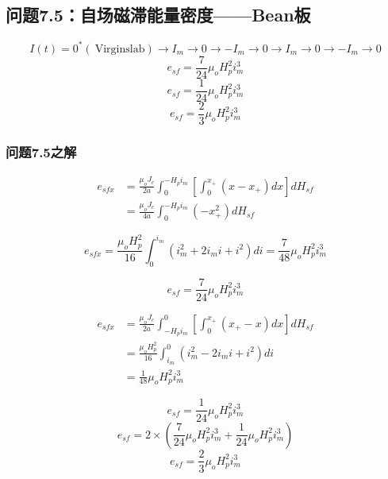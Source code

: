 \subsection{问题7.5：自场磁滞能量密度——Bean板}
\begin{equation}%
I(t)=0^*(\ \mathrm{Virgin slab})\rightarrow I_m\rightarrow 0\rightarrow -I_m\rightarrow 0\rightarrow I_m\rightarrow 0\rightarrow -I_m\rightarrow 0
\end{equation}
\begin{equation}%
e_{sf}=\frac{7}{24}\mu_oH_{p}^{2}i_{m}^{3}
\end{equation}
\begin{equation}%
e_{sf}=\frac{1}{24}\mu_oH_{p}^{2}i_{m}^{3}
\end{equation}
\begin{equation}%
e_{sf}=\frac{2}{3}\mu_oH_{p}^{2}i_{m}^{3}
\end{equation}

\subsubsection{问题7.5之解}
\begin{align*}%
e_{sfx}&=\frac{\mu_oJ_c}{2a}\int_{0}^{-H_pi_m}\left[\int_{0}^{x_+}(x-x_+)dx\right]dH_{sf} \\
&=\frac{\mu_oJ_c}{4a}\int_{0}^{-H_pi_m}(-x_{+}^{2})dH_{sf}
\end{align*}

\begin{equation}%
e_{sfx}=\frac{\mu_oH_{p}^{2}}{16}\int_{0}^{i_m}(i_{m}^{2}+2i_mi+i^2)di 
=\frac{7}{48}\mu_oH_{p}^{2}i_{m}^{3}
\end{equation}

\begin{equation}%
e_{sf}=\frac{7}{24}\mu_oH_{p}^{2}i_{m}^{3}
\end{equation}


\begin{align*}%
e_{sfx}&=\frac{\mu_oJ_c}{2a}\int_{-H_pi_m}^{0}\left[\int_{0}^{x_+}(x_+-x)dx\right]dH_{sf} \\
&=\frac{\mu_oH_{p}^{2}}{16}\int_{i_m}^{0}(i_{m}^{2}-2i_mi+i^2)di \\
&=\frac{1}{48}\mu_oH_{p}^{2}i_{m}^{3}
\end{align*}


\begin{equation}%
e_{sf}=\frac{1}{24}\mu_oH_{p}^{2}i_{m}^{3}
\end{equation}
\begin{equation}%
e_{sf}=2\times\left(\frac{7}{24}\mu_oH_{p}^{2}i_{m}^{3}+\frac{1}{24}\mu_oH_{p}^{2}i_{m}^{3}\right)
\end{equation}
\begin{equation}%
e_{sf}=\frac{2}{3}\mu_oH_{p}^{2}i_{m}^{3}
\end{equation}


